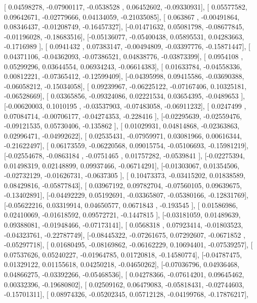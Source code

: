 \documentclass{article}
\begin{document}
       [ 0.04598278, -0.07900117, -0.0538528 ,  0.06452602, -0.09330931],
       [ 0.05577582,  0.09642671, -0.02779666,  0.04134059, -0.21035085],
       [ 0.063867  , -0.00491864,  0.08346437, -0.01208749, -0.16457327],
       [-0.01471632,  0.05081798, -0.08677845, -0.01196028, -0.18683516],
       [-0.05136077, -0.05400438,  0.05895531,  0.04283663, -0.1716989 ],
       [ 0.0941432 ,  0.07383147, -0.00494809, -0.03397776, -0.15871447],
       [ 0.04371106, -0.04362093, -0.07386521,  0.04838776, -0.03873399],
       [ 0.0954108 ,  0.05299296,  0.03644554,  0.06934243, -0.06614383],
       [ 0.01633784, -0.04558336,  0.00812221, -0.07365412, -0.12599409],
       [-0.04395998,  0.09415586, -0.03690388, -0.06058212, -0.15034058],
       [ 0.09239967, -0.06225122, -0.07167406,  0.10325181, -0.06528669],
       [ 0.03365856, -0.09324086,  0.02221534,  0.03654395, -0.0489653 ],
       [-0.00620003,  0.1010195 , -0.03537903, -0.07483058, -0.06911232],
       [ 0.0247499 ,  0.07084714, -0.00706177, -0.04274353, -0.228416  ],
       [-0.02295639, -0.02559476, -0.09121535,  0.05730406, -0.135862  ],
       [ 0.01029931,  0.04814868, -0.02363863,  0.02996471, -0.04992622],
       [ 0.02535431, -0.07959971,  0.03081966,  0.00616344, -0.21622497],
       [ 0.06173559, -0.06220568,  0.09015754, -0.05106693, -0.15981219],
       [-0.02554678, -0.0863184 , -0.0751465 ,  0.01757282, -0.0539841 ],
       [-0.02275394,  0.01498319,  0.02148899,  0.09937466, -0.06714291],
       [-0.01303067,  0.01354506, -0.02732129, -0.01626731, -0.0637305 ],
       [ 0.10473373, -0.03415202,  0.01838589,  0.08429816, -0.05877843],
       [ 0.03967192,  0.09782704, -0.07560105,  0.09639675, -0.13402891],
       [-0.04492229,  0.05192691, -0.03365807, -0.05380166, -0.12831769],
       [-0.05622216,  0.03319914,  0.04650577,  0.0671843 , -0.193545  ],
       [ 0.01586986,  0.02410069, -0.01618592,  0.09572721, -0.1447815 ],
       [-0.03181059,  0.01489639,  0.09388081, -0.01948466, -0.07173141],
       [ 0.0568318 ,  0.07923414, -0.01803523, -0.04323761, -0.22787749],
       [-0.08445322, -0.07261675,  0.07292607, -0.0671852 , -0.05297718],
       [ 0.01680495, -0.08169862, -0.06162229,  0.10694401, -0.07539257],
       [ 0.07537626,  0.05240227, -0.01964785,  0.01720818, -0.14580774],
       [-0.04787475,  0.01329122,  0.01155618,  0.04250218, -0.04650262],
       [-0.07036796,  0.04936468,  0.04866275, -0.03392266, -0.05468536],
       [ 0.04278366, -0.07614201,  0.09645462,  0.00332396, -0.19680802],
       [ 0.02509162,  0.06479083, -0.05818431, -0.02744603, -0.15701311],
       [ 0.08974326, -0.05202345,  0.05712128, -0.04199768, -0.17876217],
\end{document}
